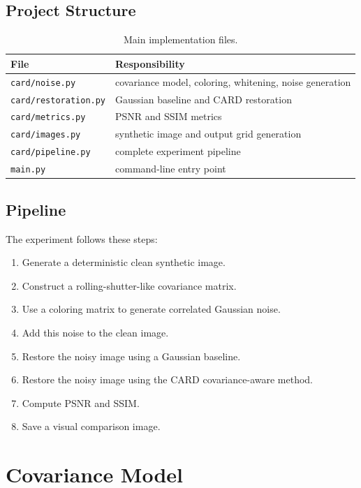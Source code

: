 \documentclass[12pt,a4paper]{article}
\begin{document}
\subsection{Project Structure}

\begin{table}[h]
  \centering
  \begin{tabular}{ll}
    \toprule
    File & Responsibility \\
    \midrule
    \texttt{card/noise.py} & covariance model, coloring, whitening, noise generation \\
    \texttt{card/restoration.py} & Gaussian baseline and CARD restoration \\
    \texttt{card/metrics.py} & PSNR and SSIM metrics \\
    \texttt{card/images.py} & synthetic image and output grid generation \\
    \texttt{card/pipeline.py} & complete experiment pipeline \\
    \texttt{main.py} & command-line entry point \\
    \bottomrule
  \end{tabular}
  \caption{Main implementation files.}
\end{table}

\subsection{Pipeline}

The experiment follows these steps:

\begin{enumerate}
  \item Generate a deterministic clean synthetic image.
  \item Construct a rolling-shutter-like covariance matrix.
  \item Use a coloring matrix to generate correlated Gaussian noise.
  \item Add this noise to the clean image.
  \item Restore the noisy image using a Gaussian baseline.
  \item Restore the noisy image using the CARD covariance-aware method.
  \item Compute PSNR and SSIM.
  \item Save a visual comparison image.
\end{enumerate}

\section{Covariance Model}
\end{document}
